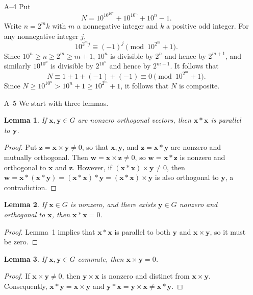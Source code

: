 \documentclass[amssymb,twocolumn,pra,10pt,aps]{revtex4-1}
\newtheorem{lemma}{Lemma}
\begin{document}
\begin{itemize}
\item[A--4]
Put
\[
N = 10^{10^{10^n}} + 10^{10^n} + 10^n - 1.
\]
Write $n = 2^m k$ with $m$ a nonnegative integer and $k$ a positive odd integer.
For any nonnegative integer $j$,
\[
10^{2^m j} \equiv (-1)^j \pmod{10^{2^m} + 1}.
\]
Since $10^n \geq n \geq 2^m \geq m+1$, $10^n$ is divisible by $2^n$ and hence by $2^{m+1}$,
and similarly $10^{10^n}$ is divisible by $2^{10^n}$ and hence by $2^{m+1}$. It follows that
\[
N \equiv 1 + 1 + (-1) + (-1) \equiv 0 \pmod{10^{2^m} + 1}.
\]
Since $N \geq 10^{10^n} > 10^n + 1 \geq 10^{2^m} + 1$, it follows that $N$ is composite.

\item[A--5]
We start with three lemmas.
\setcounter{lemma}{0}
\begin{lemma}
If $\mathbf{x},\mathbf{y} \in G$ are nonzero orthogonal vectors, then $\mathbf{x}*\mathbf{x}$ is parallel to $\mathbf{y}$.
\end{lemma}
\begin{proof}
Put $\mathbf{z} = \mathbf{x} \times \mathbf{y} \neq 0$, so that $\mathbf{x},\mathbf{y}$, and $\mathbf{z} = \mathbf{x}*\mathbf{y}$ are nonzero and mutually orthogonal.
Then $\mathbf{w} = \mathbf{x} \times \mathbf{z} \neq 0$, so $\mathbf{w} = \mathbf{x}*\mathbf{z}$ is nonzero and orthogonal to $\mathbf{x}$ and $\mathbf{z}$.
However, if $(\mathbf{x}*\mathbf{x}) \times \mathbf{y} \neq 0$, then $\mathbf{w} = \mathbf{x}*(\mathbf{x}*\mathbf{y}) = (\mathbf{x}*\mathbf{x})*\mathbf{y} = (\mathbf{x}*\mathbf{x}) \times \mathbf{y}$ is also orthogonal to $\mathbf{y}$, a contradiction.
\end{proof}
\begin{lemma}
If $\mathbf{x} \in G$ is nonzero, and there exists $\mathbf{y} \in G$ nonzero and orthogonal to $\mathbf{x}$, then $\mathbf{x}*\mathbf{x} = 0$.
\end{lemma}
\begin{proof}
Lemma~1 implies that $\mathbf{x}*\mathbf{x}$ is parallel to both $\mathbf{y}$ and $\mathbf{x} \times \mathbf{y}$, so it must be zero.
\end{proof}
\begin{lemma}
If $\mathbf{x},\mathbf{y} \in G$ commute, then $\mathbf{x} \times \mathbf{y} = 0$.
\end{lemma}
\begin{proof}
If $\mathbf{x} \times \mathbf{y} \neq 0$, then $\mathbf{y} \times \mathbf{x}$ is nonzero
and distinct from $\mathbf{x} \times \mathbf{y}$. Consequently,
$\mathbf{x}*\mathbf{y} = \mathbf{x} \times \mathbf{y}$
and $\mathbf{y}*\mathbf{x} = \mathbf{y} \times \mathbf{x} \neq \mathbf{x} * \mathbf{y}$.
\end{proof}


\end{itemize}
\end{document}
